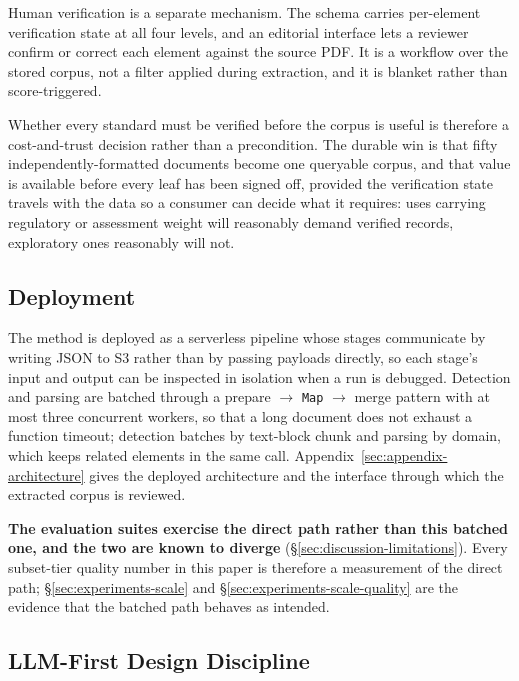 Human verification is a separate mechanism. The schema carries per-element
verification state at all four levels, and an editorial interface lets a
reviewer confirm or correct each element against the source PDF. It is a
workflow over the stored corpus, not a filter applied during extraction, and it
is blanket rather than score-triggered.

Whether every standard must be verified before the corpus is useful is
therefore a cost-and-trust decision rather than a precondition. The durable win
is that fifty independently-formatted documents become one queryable corpus,
and that value is available before every leaf has been signed off, provided the
verification state travels with the data so a consumer can decide what it
requires: uses carrying regulatory or assessment weight will reasonably demand
verified records, exploratory ones reasonably will not.

\subsection{Deployment}
\label{sec:method-deployment}

The method is deployed as a serverless pipeline whose stages communicate by
writing JSON to S3 rather than by passing payloads directly, so each stage's
input and output can be inspected in isolation when a run is debugged.
Detection and parsing are batched through a prepare $\rightarrow$ \texttt{Map}
$\rightarrow$ merge pattern with at most three concurrent workers, so that a
long document does not exhaust a function timeout; detection batches by
text-block chunk and parsing by domain, which keeps related elements in the
same call. Appendix~\ref{sec:appendix-architecture} gives the deployed
architecture and the interface through which the extracted corpus is reviewed.

\textbf{The evaluation suites exercise the direct path rather than this batched
one, and the two are known to diverge}
(\S\ref{sec:discussion-limitations}). Every subset-tier quality number in this
paper is therefore a measurement of the direct path;
\S\ref{sec:experiments-scale} and \S\ref{sec:experiments-scale-quality} are the
evidence that the batched path behaves as intended.

\subsection{LLM-First Design Discipline}
\label{sec:method-llm-first}

